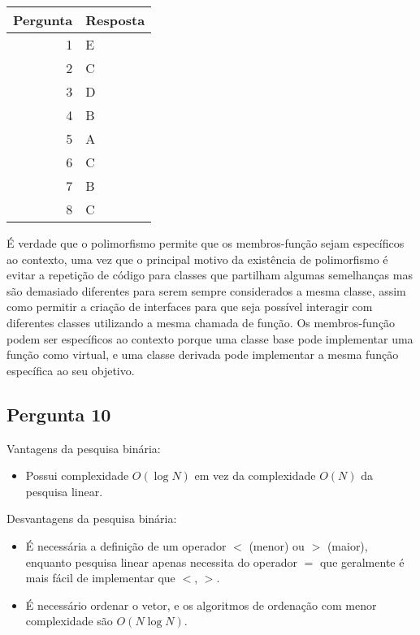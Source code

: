 \setcounter{chapter}{17}
\begin{center}
\begin{tabular}{r | l}
	Pergunta & Resposta \\ \hline
	1 & E \\
	2 & C \\
	3 & D \\
	4 & B \\
	5 & A \\
	6 & C \\
	7 & B \\
	8 & C
\end{tabular}
\end{center}
É verdade que o polimorfismo permite que os membros-função sejam específicos ao contexto, uma vez que o principal motivo da existência de polimorfismo é evitar a repetição de código para classes que partilham algumas semelhanças mas são demasiado diferentes para serem sempre considerados a mesma classe, assim como permitir a criação de interfaces para que seja possível interagir com diferentes classes utilizando a mesma chamada de função. Os membros-função podem ser específicos ao contexto porque uma classe base pode implementar uma função como virtual, e uma classe derivada pode implementar a mesma função específica ao seu objetivo.
\subsection{Pergunta 10}
Vantagens da pesquisa binária:
\begin{itemize}
	\item Possui complexidade $O(\log N)$ em vez da complexidade $O(N)$ da pesquisa linear.
\end{itemize}
Desvantagens da pesquisa binária:
\begin{itemize}
	\item É necessária a definição de um operador $<$ (menor) ou $>$ (maior), enquanto pesquisa linear apenas necessita do operador $=$ que geralmente é mais fácil de implementar que $<$, $>$.
	\item É necessário ordenar o vetor, e os algoritmos de ordenação com menor complexidade são $O(N\log N)$.
\end{itemize}

